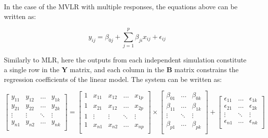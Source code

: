 \documentclass[12pt]{article}
\begin{document}
{%


In the case of the MVLR with multiple responses, the equations above can be written as:

\begin{equation}
y_{ij}=\beta_{0j}+\sum^{p}_{j=1}\beta_{ji}x_{ij}+\epsilon_{ij}
\end{equation}

 Similarly to MLR, here the outputs from each independent simulation constitute a single row in the $\mathbf{Y}$ matrix, and each column in the $\mathbf{B}$ matrix constrains the regression coefficients of the linear  model. The system can be written as: 

 \[
 \begin{bmatrix}
 y_{11} &  y_{12} & \dots &  y_{1k} \\
 y_{21} &   y_{22} & \dots & y_{2k} \\
 \vdots &  \vdots  & \ddots & \vdots \\
 y_{n1} &  y_{n2} & \dots & y_{nk} \\
 \end{bmatrix}
 =
\begin{bmatrix} 
1 & x_{11} & x_{12} & \dots & x_{1p} \\
1 & x_{21} & x_{12} & \dots & x_{2p} \\
1 & \vdots & \vdots & \ddots & \vdots \\
1 & x_{n1} & x_{n2} & \dots & x_{np} \\
\end{bmatrix}
\times
\begin{bmatrix} \label{eq:betas}
\beta_{01} & \dots & \beta_{0k} \\
\beta_{11} & \dots & \beta_{1k} \\
\vdots & \ddots & \vdots \\
\beta_{p1} & \dots & \beta_{pk} \\
\end{bmatrix}
+
\begin{bmatrix} 
\epsilon_{11} & \dots & \epsilon_{1k} \\
\epsilon_{21} & \dots & \epsilon_{2k} \\
\vdots & \ddots & \vdots \\
\epsilon_{n1} & \dots & \epsilon_{nk} \\
\end{bmatrix}
\]

}
\end{document}
